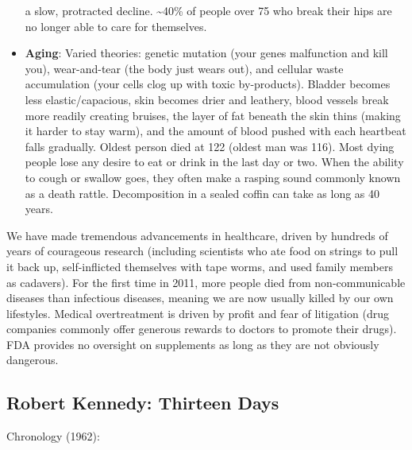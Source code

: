 \documentclass[
]{article}
\begin{document}
\begin{itemize}
  a slow, protracted decline. \textasciitilde40\% of people over 75 who
  break their hips are no longer able to care for themselves.
\item
  \textbf{Aging}: Varied theories: genetic mutation (your genes
  malfunction and kill you), wear-and-tear (the body just wears out),
  and cellular waste accumulation (your cells clog up with toxic
  by-products). Bladder becomes less elastic/capacious, skin becomes
  drier and leathery, blood vessels break more readily creating bruises,
  the layer of fat beneath the skin thins (making it harder to stay
  warm), and the amount of blood pushed with each heartbeat falls
  gradually. Oldest person died at 122 (oldest man was 116). Most dying
  people lose any desire to eat or drink in the last day or two. When
  the ability to cough or swallow goes, they often make a rasping sound
  commonly known as a death rattle. Decomposition in a sealed coffin can
  take as long as 40 years.
\end{itemize}

We have made tremendous advancements in healthcare, driven by hundreds
of years of courageous research (including scientists who ate food on
strings to pull it back up, self-inflicted themselves with tape worms,
and used family members as cadavers). For the first time in 2011, more
people died from non-communicable diseases than infectious diseases,
meaning we are now usually killed by our own lifestyles. Medical
overtreatment is driven by profit and fear of litigation (drug companies
commonly offer generous rewards to doctors to promote their drugs). FDA
provides no oversight on supplements as long as they are not obviously
dangerous.

\hypertarget{robert-kennedy-thirteen-days}{%
\subsection{Robert Kennedy: Thirteen
Days}\label{robert-kennedy-thirteen-days}}

Chronology (1962):
\end{document}
